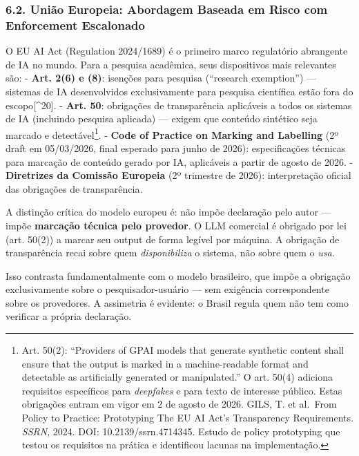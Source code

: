 \documentclass[
  12pt,
  a4paper,
  brazil
]{article}
\begin{document}
\subsubsection{6.2. União Europeia: Abordagem Baseada em Risco com
Enforcement
Escalonado}\label{uniuxe3o-europeia-abordagem-baseada-em-risco-com-enforcement-escalonado}

O EU AI Act (Regulation 2024/1689) é o primeiro marco regulatório
abrangente de IA no mundo. Para a pesquisa acadêmica, seus dispositivos
mais relevantes são: - \textbf{Art. 2(6) e (8)}: isenções para pesquisa
(``research exemption'') --- sistemas de IA desenvolvidos exclusivamente
para pesquisa científica estão fora do escopo{[}\^{}20{]}. -
\textbf{Art. 50}: obrigações de transparência aplicáveis a todos os
sistemas de IA (incluindo pesquisa aplicada) --- exigem que conteúdo
sintético seja marcado e detectável\footnote{Art. 50(2): ``Providers of
  GPAI models that generate synthetic content shall ensure that the
  output is marked in a machine-readable format and detectable as
  artificially generated or manipulated.'' O art. 50(4) adiciona
  requisitos específicos para \emph{deepfakes} e para texto de interesse
  público. Estas obrigações entram em vigor em 2 de agosto de 2026.
  GILS, T. et al.~From Policy to Practice: Prototyping The EU AI Act's
  Transparency Requirements. \emph{SSRN}, 2024. DOI:
  10.2139/ssrn.4714345. Estudo de policy prototyping que testou os
  requisitos na prática e identificou lacunas na implementação.}. -
\textbf{Code of Practice on Marking and Labelling} (2º draft em
05/03/2026, final esperado para junho de 2026): especificações técnicas
para marcação de conteúdo gerado por IA, aplicáveis a partir de agosto
de 2026. - \textbf{Diretrizes da Comissão Europeia} (2º trimestre de
2026): interpretação oficial das obrigações de transparência.

A distinção crítica do modelo europeu é: não impõe declaração pelo autor
--- impõe \textbf{marcação técnica pelo provedor}. O LLM comercial é
obrigado por lei (art. 50(2)) a marcar seu output de forma legível por
máquina. A obrigação de transparência recai sobre quem
\emph{disponibiliza} o sistema, não sobre quem o \emph{usa}.

Isso contrasta fundamentalmente com o modelo brasileiro, que impõe a
obrigação exclusivamente sobre o pesquisador-usuário --- sem exigência
correspondente sobre os provedores. A assimetria é evidente: o Brasil
regula quem não tem como verificar a própria declaração.
\end{document}
